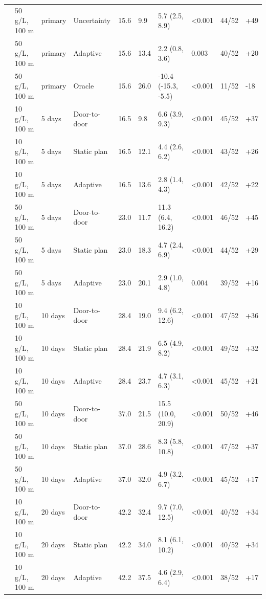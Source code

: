 \documentclass[sustainability,article,submit,pdftex,moreauthors]{Definitions/mdpi}
\begin{document}
{\begin{longtable}{L{3.0cm}L{2.0cm}L{1.0cm}L{1.6cm}R{1.0cm}R{1.4cm}L{2.4cm}R{0.9cm}R{0.8cm}R{0.9cm}}
 & 50 \textmu{}g/L, 100 m & primary & Uncertainty & 15.6 & 9.9 & 5.7 (2.5, 8.9) & <0.001 & 44/52 & +49 \\
 & 50 \textmu{}g/L, 100 m & primary & Adaptive & 15.6 & 13.4 & 2.2 (0.8, 3.6) & 0.003 & 40/52 & +20 \\
 & 50 \textmu{}g/L, 100 m & primary & Oracle & 15.6 & 26.0 & -10.4 (-15.3, -5.5) & <0.001 & 11/52 & -18 \\
 & 10 \textmu{}g/L, 100 m & 5 days & Door-to-door & 16.5 & 9.8 & 6.6 (3.9, 9.3) & <0.001 & 45/52 & +37 \\
 & 10 \textmu{}g/L, 100 m & 5 days & Static plan & 16.5 & 12.1 & 4.4 (2.6, 6.2) & <0.001 & 43/52 & +26 \\
 & 10 \textmu{}g/L, 100 m & 5 days & Adaptive & 16.5 & 13.6 & 2.8 (1.4, 4.3) & <0.001 & 42/52 & +22 \\
 & 50 \textmu{}g/L, 100 m & 5 days & Door-to-door & 23.0 & 11.7 & 11.3 (6.4, 16.2) & <0.001 & 46/52 & +45 \\
 & 50 \textmu{}g/L, 100 m & 5 days & Static plan & 23.0 & 18.3 & 4.7 (2.4, 6.9) & <0.001 & 44/52 & +29 \\
 & 50 \textmu{}g/L, 100 m & 5 days & Adaptive & 23.0 & 20.1 & 2.9 (1.0, 4.8) & 0.004 & 39/52 & +16 \\
 & 10 \textmu{}g/L, 100 m & 10 days & Door-to-door & 28.4 & 19.0 & 9.4 (6.2, 12.6) & <0.001 & 47/52 & +36 \\
 & 10 \textmu{}g/L, 100 m & 10 days & Static plan & 28.4 & 21.9 & 6.5 (4.9, 8.2) & <0.001 & 49/52 & +32 \\
 & 10 \textmu{}g/L, 100 m & 10 days & Adaptive & 28.4 & 23.7 & 4.7 (3.1, 6.3) & <0.001 & 45/52 & +21 \\
 & 50 \textmu{}g/L, 100 m & 10 days & Door-to-door & 37.0 & 21.5 & 15.5 (10.0, 20.9) & <0.001 & 50/52 & +46 \\
 & 50 \textmu{}g/L, 100 m & 10 days & Static plan & 37.0 & 28.6 & 8.3 (5.8, 10.8) & <0.001 & 47/52 & +37 \\
 & 50 \textmu{}g/L, 100 m & 10 days & Adaptive & 37.0 & 32.0 & 4.9 (3.2, 6.7) & <0.001 & 45/52 & +17 \\
 & 10 \textmu{}g/L, 100 m & 20 days & Door-to-door & 42.2 & 32.4 & 9.7 (7.0, 12.5) & <0.001 & 40/52 & +34 \\
 & 10 \textmu{}g/L, 100 m & 20 days & Static plan & 42.2 & 34.0 & 8.1 (6.1, 10.2) & <0.001 & 40/52 & +34 \\
 & 10 \textmu{}g/L, 100 m & 20 days & Adaptive & 42.2 & 37.5 & 4.6 (2.9, 6.4) & <0.001 & 38/52 & +17 \\

\end{longtable}}
\end{document}
